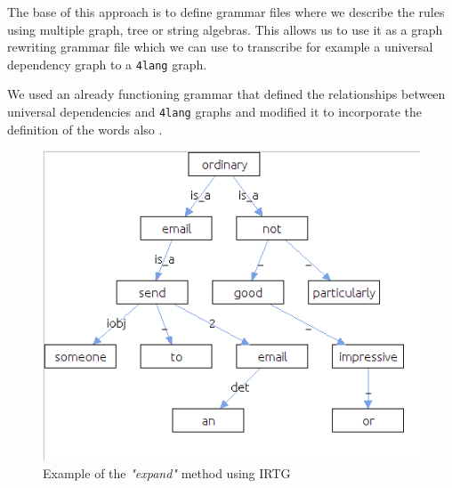 The base of this approach is to define grammar files where we describe the rules using multiple graph, tree or string algebras. This allows us to use it as a graph rewriting grammar file which we can use to transcribe for example a universal dependency graph to a \texttt{4lang} graph.

We used an already functioning grammar that defined the relationships between universal dependencies and \texttt{4lang} graphs and modified it to incorporate the definition of the words also \cite{AcsEvelin:2018}.

\begin{figure}[h]
	\centering
	\includegraphics[scale=0.4]{figures/irtg.jpg}
	\caption{Example of the \textit{"expand"} method using IRTG}
	\label{fig:irtg}
\end{figure}